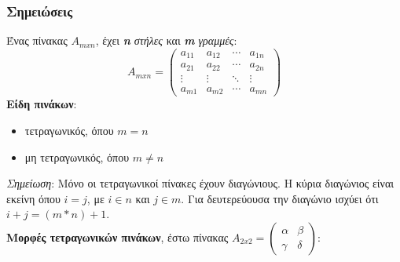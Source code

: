 \documentclass[a4paper,12pt]{article}
\begin{document}
\subsubsection{Σημειώσεις}
Ένας πίνακας $A_{mxn}$, έχει \textit{\textbf{n} στήλες} και
\textit{\textbf{m} γραμμές}:
\begin{equation*}
    A_{mxn} = \begin{pmatrix}
        a_{11} & a_{12} & \cdots & a_{1n} \\
        a_{21} & a_{22} & \cdots & a_{2n} \\
        \vdots & \vdots & \ddots & \vdots \\
        a_{m1} & a_{m2} & \cdots & a_{mn}
    \end{pmatrix}
\end{equation*}
\textbf{Είδη πινάκων}:
\begin{itemize}
    \item τετραγωνικός, όπου $m = n$
    \item μη τετραγωνικός, όπου $m \neq n$
\end{itemize}
\textit{Σημείωση}: Μόνο οι τετραγωνικοί πίνακες έχουν διαγώνιους. Η κύρια διαγώνιος
είναι εκείνη όπου $i = j$, με $i \in n$ και $j \in m$. Για δευτερεύουσα την
διαγώνιο ισχύει ότι $i+j=(m*n)+1$.\\
\textbf{Μορφές τετραγωνικών πινάκων}, έστω πίνακας
$
    A_{2x2}=
    \begin{pmatrix}
        \alpha & \beta  \\
        \gamma & \delta
    \end{pmatrix}
$:
\end{document}
